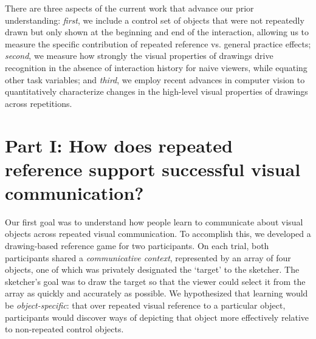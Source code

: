 \documentclass[10pt,letterpaper]{article}
\begin{document}


There are three aspects of the current work that advance our prior understanding: \emph{first}, we include a control set of objects that were not repeatedly drawn but only shown at the beginning and end of the interaction, allowing us to measure the specific contribution of repeated reference vs. general practice effects; \emph{second}, we measure how strongly the visual properties of drawings drive recognition in the absence of interaction history for naive viewers, while equating other task variables; and \emph{third}, we employ recent advances in computer vision to quantitatively characterize changes in the high-level visual properties of drawings across repetitions.



\section{Part I: How does repeated reference support successful visual communication?}

Our first goal was to understand how people learn to communicate about visual objects across repeated visual communication.
To accomplish this, we developed a drawing-based reference game for two participants.
On each trial, both participants shared a \textit{communicative context}, represented by an array of four objects, one of which was privately designated the `target' to the sketcher.
The sketcher's goal was to draw the target so that the viewer could select it from the array as quickly and accurately as possible.
We hypothesized that learning would be \emph{object-specific}: that over repeated visual reference to a particular object, participants would discover ways of depicting that object more effectively relative to non-repeated control objects.

\end{document}
